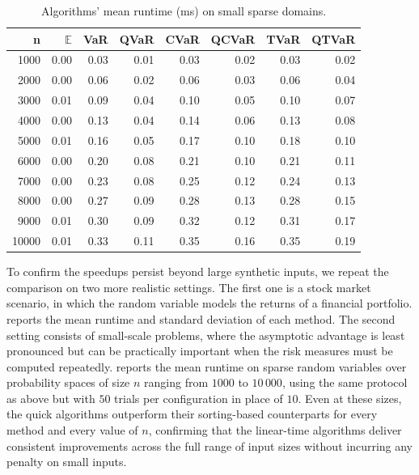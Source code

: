 \begin{table}
\centering
\caption{Algorithms' mean runtime (ms) on small sparse domains.}
\begin{tabular}{rrrrrrrr}
\toprule
n & $\mathbb{E}$ & VaR & QVaR & CVaR & QCVaR & TVaR & QTVaR \\
\midrule
1000 & 0.00 & 0.03 & 0.01 & 0.03 & 0.02 & 0.03 & 0.02\\
2000 & 0.00 & 0.06 & 0.02 & 0.06 & 0.03 & 0.06 & 0.04\\
3000 & 0.01 & 0.09 & 0.04 & 0.10 & 0.05 & 0.10 & 0.07\\
4000 & 0.00 & 0.13 & 0.04 & 0.14 & 0.06 & 0.13 & 0.08\\
5000 & 0.01 & 0.16 & 0.05 & 0.17 & 0.10 & 0.18 & 0.10\\
6000 & 0.00 & 0.20 & 0.08 & 0.21 & 0.10 & 0.21 & 0.11\\
7000 & 0.00 & 0.23 & 0.08 & 0.25 & 0.12 & 0.24 & 0.13\\
8000 & 0.00 & 0.27 & 0.09 & 0.28 & 0.13 & 0.28 & 0.15\\
9000 & 0.01 & 0.30 & 0.09 & 0.32 & 0.12 & 0.31 & 0.17\\
10000 & 0.01 & 0.33 & 0.11 & 0.35 & 0.16 & 0.35 & 0.19\\
\bottomrule
\end{tabular}
\label{tab:small_results}
\end{table}

To confirm the speedups persist beyond large synthetic inputs, we repeat the comparison on two more realistic settings. The first one is a stock market scenario, in which the random variable models the returns of a financial portfolio.  reports the mean runtime and standard deviation of each method. The second setting consists of small-scale problems, where the asymptotic advantage is least pronounced but can be practically important when the risk measures must be computed repeatedly.  reports the mean runtime on sparse random variables over probability spaces of size $n$ ranging from $1000$ to $10\,000$, using the same protocol as above but with $50$ trials per configuration in place of $10$. Even at these sizes, the quick algorithms outperform their sorting-based counterparts for every method and every value of $n$, confirming that the linear-time algorithms deliver consistent improvements across the full range of input sizes without incurring any penalty on small inputs.

